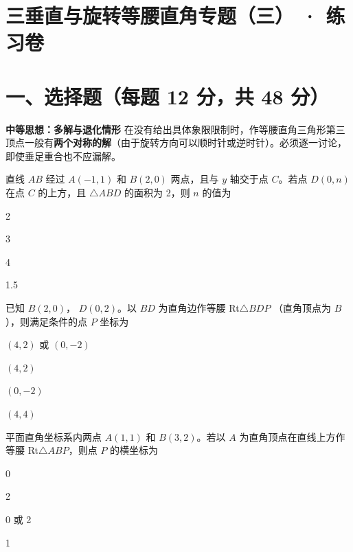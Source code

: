 \documentclass{exam-zh}
\begin{document}
\section*{三垂直与旋转等腰直角专题（三） · 练习卷}

\section*{一、选择题（每题 12 分，共 48 分）}


\begin{keyideabox}
  \textbf{中等思想：多解与退化情形}
  在没有给出具体象限限制时，作等腰直角三角形第三顶点一般有\textbf{两个对称的解}（由于旋转方向可以顺时针或逆时针）。必须逐一讨论，即使垂足重合也不应漏解。
\end{keyideabox}



\begin{question}[points=12]
  直线 $AB$ 经过 $A(-1, 1)$ 和 $B(2, 0)$ 两点，且与 $y$ 轴交于点 $C$。若点 $D(0, n)$ 在点 $C$ 的上方，且 $\triangle ABD$ 的面积为 2，则 $n$ 的值为
  \begin{choices}
    \item 2
    \item 3
    \item 4
    \item 1.5
  \end{choices}
\end{question}



\begin{question}[points=12]
  已知 $B(2, 0)$， $D(0, 2)$。以 $BD$ 为直角边作等腰 Rt$\triangle BDP$ （直角顶点为 $B$），则满足条件的点 $P$ 坐标为
  \begin{choices}
    \item $(4, 2)$ 或 $(0, -2)$
    \item $(4, 2)$
    \item $(0, -2)$
    \item $(4, 4)$
  \end{choices}
\end{question}



\begin{question}[points=12]
  平面直角坐标系内两点 $A(1, 1)$ 和 $B(3, 2)$。若以 $A$ 为直角顶点在直线上方作等腰 Rt$\triangle ABP$，则点 $P$ 的横坐标为
  \begin{choices}
    \item 0
    \item 2
    \item 0 或 2
    \item 1
  \end{choices}
\end{question}
\end{document}
